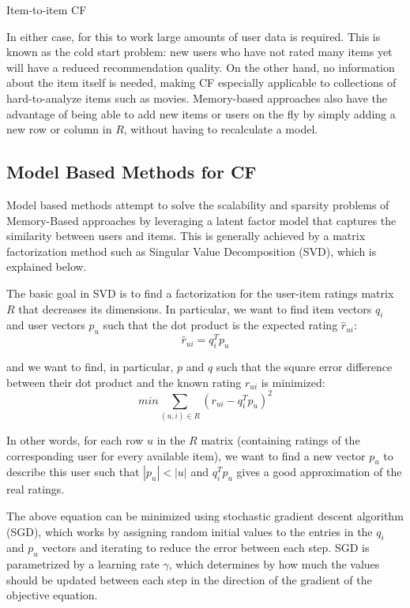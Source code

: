 \documentclass[cic,tc,english]{iiufrgs}
\newcommand{\adriano}[1]{#1}
\begin{document}
\begin{algorithm}[H]
 \caption{Item-to-item CF}
\end{algorithm}

In either case, for this to work large amounts of user data is required. This is known as the cold start problem: new users who have not rated many items yet will have a reduced recommendation quality. On the other hand, no information about the item itself is needed, making CF especially applicable to collections of hard-to-analyze items such as movies. Memory-based approaches also have the advantage of being able to add new items or users on the fly by simply adding a new row or column in $R$, without having to recalculate a model.
 
\subsection{Model Based Methods for CF} 
\label{model-based-cf}
Model based methods attempt to solve the scalability and sparsity problems of Memory-Based approaches by leveraging a latent factor model that captures the similarity between users and items. This is generally achieved by a matrix factorization method such as Singular Value Decomposition (SVD), which is explained below.

The basic goal in SVD is to find a factorization for the user-item ratings matrix $R$ that decreases its dimensions. In particular, we want to find item vectors $q_i$ and user vectors $p_u$ such that the dot product is the expected rating $\hat{r}_{ui}$:
$$
\hat{r}_{ui} = q_i^Tp_u
$$

\noindent and we want to find, in particular, $p$ and $q$ such that the square error difference between their dot product and the known rating $r_{ui}$ is minimized:
$$
min \sum_{(u,i)\in R}{(r_{ui} -  q_i^Tp_u)^2}
$$

\adriano{In other words, for each row $u$ in the $R$ matrix (containing ratings of the corresponding user for every available item), we want to find a new vector $p_u$ to describe this user such that $|p_u| < |u|$ and $q_i^Tp_u$ gives a good approximation of the real ratings. }

The above equation can be minimized using stochastic gradient descent algorithm (SGD), which works by assigning random initial values to the entries in the $q_i$ and $p_u$ vectors and iterating to reduce the error between each step. SGD is parametrized by a learning rate $\gamma$, which determines by how much the values should be updated between each step in the direction of the gradient of the objective equation.
\end{document}
